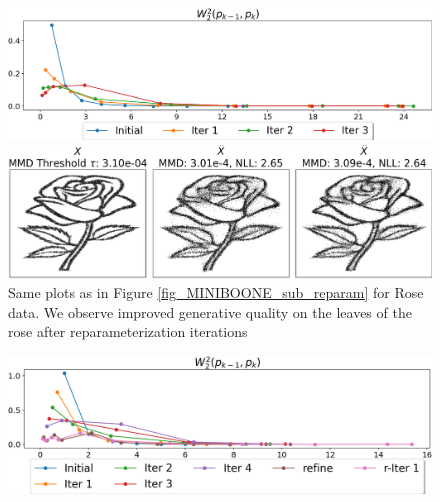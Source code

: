 \documentclass{article}
\theoremstyle{remark}
\theoremstyle{plain}
\begin{document}
{\begin{figure}[!t]
    \centering
    \begin{minipage}{0.49\textwidth}
    \includegraphics[width=\textwidth]{img_rose_Prune_and_refine_5phases_eta=075.png}
    \end{minipage}
    \hfill
    \begin{minipage}{0.49\textwidth}
    \includegraphics[width=\textwidth]{Img_rose_true_vs_gen_together.png}
    \end{minipage}
    \caption{
    Same plots as in Figure \ref{fig_MINIBOONE_sub_reparam} for Rose data.
    We observe improved generative quality on the leaves of the rose after reparameterization iterations}
    \label{fig_rose_sub_reparam}
\end{figure}
\begin{figure}[!t]
    \centering
    \begin{minipage}{0.49\textwidth}
    \includegraphics[width=\textwidth]{img_tree_Prune_and_refine_5phases_eta=05.png}
\end{minipage}
\end{figure}}
\end{document}
